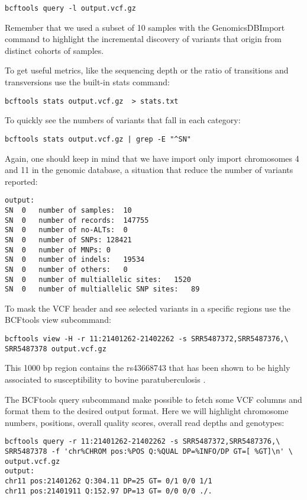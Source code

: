 \begin{verbatim}
bcftools query -l output.vcf.gz
\end{verbatim}

Remember that we used a subset of 10 samples with the GenomicsDBImport command to highlight the incremental discovery of variants that origin from distinct cohorts of samples.


To get useful metrics, like the sequencing depth or the ratio of transitions and transversions use the built-in stats command:
\begin{verbatim}
bcftools stats output.vcf.gz  > stats.txt
\end{verbatim}

To quickly see the numbers of variants that fall in each category:
\begin{verbatim}
bcftools stats output.vcf.gz | grep -E "^SN"
\end{verbatim}

Again, one should keep in mind that we have import only import chromosomes 4 and 11 in the genomic database, a situation that reduce the number of variants reported:

\begin{verbatim}
output:
SN	0	number of samples:	10
SN	0	number of records:	147755
SN	0	number of no-ALTs:	0
SN	0	number of SNPs:	128421
SN	0	number of MNPs:	0
SN	0	number of indels:	19534
SN	0	number of others:	0
SN	0	number of multiallelic sites:	1520
SN	0	number of multiallelic SNP sites:	89
\end{verbatim}


To mask the VCF header and see selected variants in a specific regions use the BCFtools view subcommand:
\begin{verbatim}
bcftools view -H -r 11:21401262-21402262 -s SRR5487372,SRR5487376,\
SRR5487378 output.vcf.gz
\end{verbatim}



This 1000 bp region contains the rs43668743 that has been shown to be highly associated to susceptibility to bovine paratuberculosis \cite{Ariel2021}.

The BCFtools query subcommand make possible to fetch some VCF columns and format them to the desired output format. Here we will highlight chromosome numbers, positions, overall quality scores, overall read depths and genotypes:

\begin{verbatim}
bcftools query -r 11:21401262-21402262 -s SRR5487372,SRR5487376,\
SRR5487378 -f 'chr%CHROM pos:%POS Q:%QUAL DP=%INFO/DP GT=[ %GT]\n' \
output.vcf.gz
output:
chr11 pos:21401262 Q:304.11 DP=25 GT= 0/1 0/0 1/1
chr11 pos:21401911 Q:152.97 DP=13 GT= 0/0 0/0 ./.
\end{verbatim}



